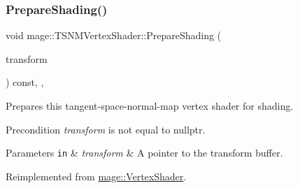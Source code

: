 \subsubsection{\texorpdfstring{Prepare\+Shading()}{PrepareShading()}}
{\footnotesize\ttfamily void mage\+::\+T\+S\+N\+M\+Vertex\+Shader\+::\+Prepare\+Shading (\begin{DoxyParamCaption}\item[{I\+D3\+D11\+Buffer $\ast$}]{transform }\end{DoxyParamCaption}) const\hspace{0.3cm}{\ttfamily [final]}, {\ttfamily [override]}, {\ttfamily [virtual]}}

Prepares this tangent-\/space-\/normal-\/map vertex shader for shading.

\begin{DoxyPrecond}{Precondition}
{\itshape transform} is not equal to {\ttfamily nullptr}. 
\end{DoxyPrecond}

\begin{DoxyParams}[1]{Parameters}
\mbox{\tt in}  & {\em transform} & A pointer to the transform buffer. \\
\hline
\end{DoxyParams}


Reimplemented from \hyperlink{classmage_1_1_vertex_shader_a53f4b25241f6c5739724d421c9f29a36}{mage\+::\+Vertex\+Shader}.

